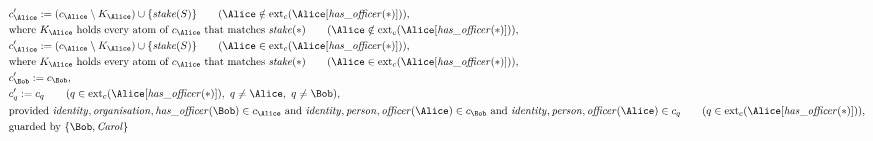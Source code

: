 \begin{align*}
&
c'_
{
\Alice
}
 := 
(
c_
{
\Alice
}
 \setminus K_
{
\Alice
}
) \cup 
\{
\mathit{\detokenize{
stake
}}
(
S
)
\}
 \qquad (
\Alice
 \notin 
\mathrm{ext}_c(
\Alice
[
\mathit{\detokenize{
has_officer
}}
(
\ast
)
]
)
)
,\\
&
\text{where } K_
{
\Alice
}
 \text{ holds every atom of } c_
{
\Alice
}
 \text{ that matches } 
\mathit{\detokenize{
stake
}}
(
\ast
)
 \qquad (
\Alice
 \notin 
\mathrm{ext}_c(
\Alice
[
\mathit{\detokenize{
has_officer
}}
(
\ast
)
]
)
)
,\\
&
c'_
{
\Alice
}
 := 
(
c_
{
\Alice
}
 \setminus K_
{
\Alice
}
) \cup 
\{
\mathit{\detokenize{
stake
}}
(
S
)
\}
 \qquad (
\Alice
 \in 
\mathrm{ext}_c(
\Alice
[
\mathit{\detokenize{
has_officer
}}
(
\ast
)
]
)
)
,\\
&
\text{where } K_
{
\Alice
}
 \text{ holds every atom of } c_
{
\Alice
}
 \text{ that matches } 
\mathit{\detokenize{
stake
}}
(
\ast
)
 \qquad (
\Alice
 \in 
\mathrm{ext}_c(
\Alice
[
\mathit{\detokenize{
has_officer
}}
(
\ast
)
]
)
)
,\\
&
c'_
{
\Bob
}
 := 
c_
{
\Bob
}
,\\
&
c'_
q
 := 
c_
q
 \qquad (
q
 \in 
\mathrm{ext}_c(
\Alice
[
\mathit{\detokenize{
has_officer
}}
(
\ast
)
]
)
,\ 
q \neq 
\Alice
,\ 
q \neq 
\Bob
)
,\\
&
\text{provided } 
\mathit{\detokenize{
identity
}}
,
\mathit{\detokenize{
organisation
}}
,
\mathit{\detokenize{
has_officer
}}
(
\Bob
)
 \in c_
{
\Alice
}
 \text{ and } 
\mathit{\detokenize{
identity
}}
,
\mathit{\detokenize{
person
}}
,
\mathit{\detokenize{
officer
}}
(
\Alice
)
 \in c_
{
\Bob
}
 \text{ and } 
\mathit{\detokenize{
identity
}}
,
\mathit{\detokenize{
person
}}
,
\mathit{\detokenize{
officer
}}
(
\Alice
)
 \in c_
q
 \qquad (
q \in 
\mathrm{ext}_c(
\Alice
[
\mathit{\detokenize{
has_officer
}}
(
\ast
)
]
)
)
,\\
&
\text{guarded by } \{
\Bob
,
\mathit{Carol}
\}
\end{align*}

